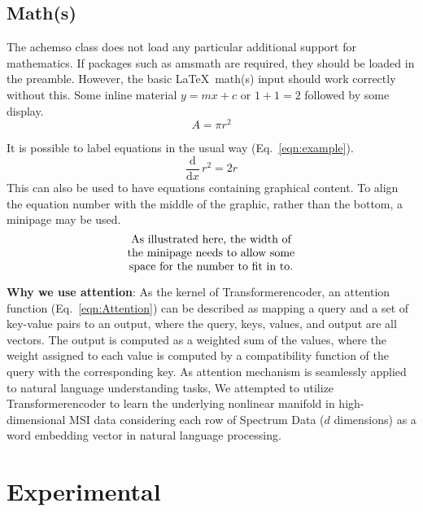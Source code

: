 \documentclass[journal=jacsat,manuscript=article]{achemso}
\begin{document}
\subsection{Math(s)}

The \textsf{achemso} class does not load any particular additional
support for mathematics.  If packages such as \textsf{amsmath} are
required, they should be loaded in the preamble.  However,
the basic \LaTeX\ math(s) input should work correctly without
this.  Some inline material \( y = mx + c \) or $ 1 + 1 = 2 $
followed by some display. \[ A = \pi r^2 \]

It is possible to label equations in the usual way (Eq.~\ref{eqn:example}).
\begin{equation}
  \frac{\mathrm{d}}{\mathrm{d}x} \, r^2 = 2r \label{eqn:example}
\end{equation}
This can also be used to have equations containing graphical
content. To align the equation number with the middle of the graphic,
rather than the bottom, a minipage may be used.
\begin{equation}
  \begin{minipage}[c]{0.80\linewidth}
    \centering
    As illustrated here, the width of \\
    the minipage needs to allow some  \\
    space for the number to fit in to.
  \end{minipage}
  \label{eqn:graphic}
\end{equation}


\textbf{Why we use attention}: As the kernel of Transformerencoder, an attention function (Eq.~\ref{eqn:Attention}) 
can be described as mapping a query 
and a set of key-value pairs to an output, where the query, keys, values, and output are all vectors. 
The output is computed as a weighted sum of the values, where the weight assigned to each value 
is computed by a compatibility function of the query with the corresponding key.
As attention mechanism is seamlessly applied to natural language understanding tasks, 
We attempted to utilize Transformerencoder to learn the underlying nonlinear manifold in high-dimensional MSI data 
considering each row of Spectrum Data ($d$ dimensions) as a word embedding vector 
in natural language processing.



\newpage
\section{Experimental}
\end{document}
